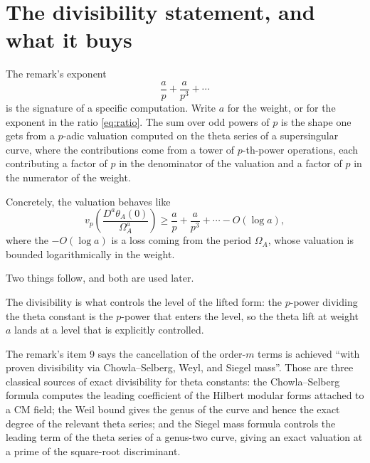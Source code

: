 \section{The divisibility statement, and what it buys}The remark's exponent
\begin{equation}
\frac{a}{p} + \frac{a}{p^3} + \cdots
\label{eq:exp}
\end{equation}
is the signature of a specific computation. Write $a$ for the weight, or for
the exponent in the ratio \eqref{eq:ratio}. The sum over odd powers of $p$ is
the shape one gets from a $p$-adic valuation computed on the theta series of a
supersingular curve, where the contributions come from a tower of
$p$-th-power operations, each contributing a factor of $p$ in the denominator
of the valuation and a factor of $p$ in the numerator of the weight.

Concretely, the valuation behaves like
\begin{equation}
v_p\!\left(\frac{D^a\theta_A(0)}{\Omega_A^a}\right) \ge \frac{a}{p} + \frac{a}{p^3} + \cdots - O(\log a),
\label{eq:val}
\end{equation}
where the $-O(\log a)$ is a loss coming from the period $\Omega_A$, whose
valuation is bounded logarithmically in the weight.

Two things follow, and both are used later.

\begin{description}[style=nextline,leftmargin=0pt,labelwidth=0pt,labelsep=0pt,font=\sffamily\bfseries\small,
  itemsep=6pt]
\item[The lift has a level.] The divisibility is what controls the level of the
lifted form: the $p$-power dividing the theta constant is the $p$-power that
enters the level, so the theta lift at weight $a$ lands at a level that is
explicitly controlled.
\item[The cancellation is order-exact.] The remark's item 9 says the
cancellation of the order-$m$ terms is achieved ``with proven divisibility via
Chowla--Selberg, Weyl, and Siegel mass''. Those are three classical sources
of exact divisibility for theta constants: the Chowla--Selberg formula
computes the leading coefficient of the Hilbert modular forms attached to a
CM field; the Weil bound gives the genus of the curve and hence the exact
degree of the relevant theta series; and the Siegel mass formula controls the
leading term of the theta series of a genus-two curve, giving an exact
valuation at a prime of the square-root discriminant.
\end{description}

